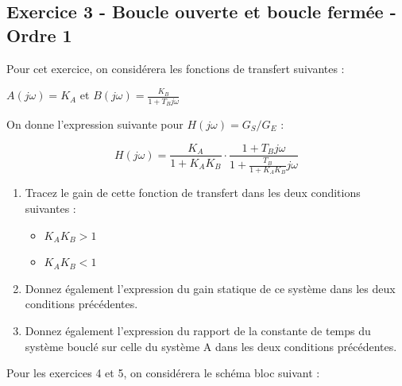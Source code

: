 \documentclass[a4paper,11pt,twoside]{book} %
\begin{document}
\newpage
\subsection{Exercice 3 - Boucle ouverte et boucle fermée - Ordre 1}

Pour cet exercice, on considérera les fonctions de transfert suivantes : 

$A(j \omega) = K_A$ et $B(j \omega) = \frac{K_B}{1 + T_B j \omega}$

On donne l'expression suivante pour $H(j \omega) = G_S / G_E$ :

$$H(j \omega) = \frac{K_A}{1 + K_A K_B} \cdot \frac{1 + T_B j \omega}{1 + \frac{T_B}{1 + K_A K_B} j \omega}$$


\begin{enumerate}
	\item Tracez le gain de cette fonction de transfert dans les deux conditions suivantes :
	\begin{itemize}
		\item $K_A K_B > 1$
		\item $K_A K_B < 1$		
	\end{itemize}
	\item Donnez également l'expression du gain statique de ce système dans les deux conditions précédentes.
	\item Donnez également l'expression du rapport de la constante de temps du système bouclé sur celle du système A dans les deux conditions précédentes.
\end{enumerate}


\noindent\hrulefill

Pour les exercices 4 et 5, on considérera le schéma bloc suivant :


\begin{center}
{\Large
{}
}
\end{center}
\end{document}
